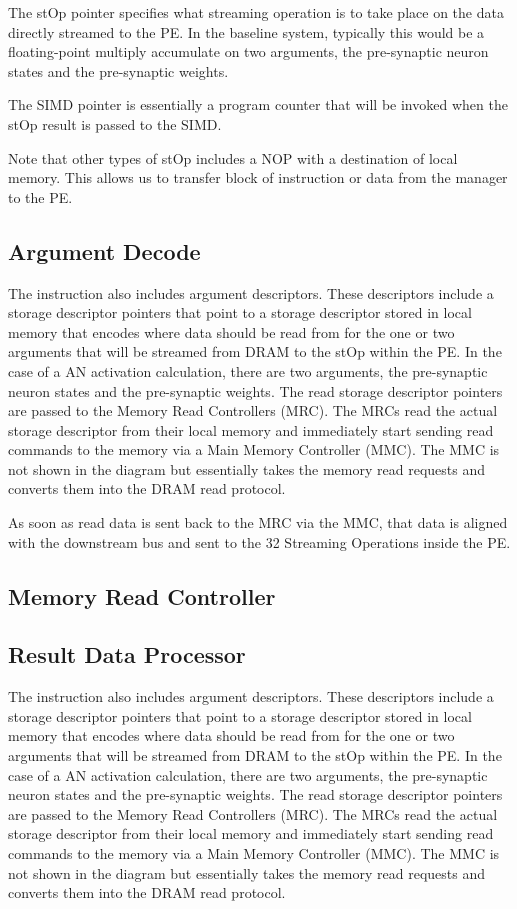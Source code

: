 The stOp pointer specifies what streaming operation is to take place on the data directly streamed to the PE. In the baseline system, typically this would be a floating-point multiply accumulate on two arguments, the pre-synaptic neuron states and the pre-synaptic weights.

The SIMD pointer is essentially a program counter that will be invoked when the stOp result is passed to the SIMD.

Note that other types of stOp includes a NOP with a destination of local memory. This allows us to transfer block of instruction or data from the manager to the PE.


\subsection{Argument Decode}
\label{sec:argumentDecode}
The instruction also includes argument descriptors. These descriptors include a storage descriptor pointers that point to a storage descriptor stored in local memory that encodes where data should be read from for the one or two arguments that will be streamed from DRAM to the stOp within the PE. In the case of a AN activation calculation, there are two arguments, the pre-synaptic neuron states and the pre-synaptic weights. The read storage descriptor pointers are passed to the Memory Read Controllers (MRC). The MRCs read the actual storage descriptor from their local memory and immediately start sending read commands to the memory via a Main Memory Controller (MMC). The MMC is not shown in the diagram but essentially takes the memory read requests and converts them into the DRAM read protocol.

As soon as read data is sent back to the MRC via the MMC, that data is aligned with the downstream bus and sent to the 32 Streaming Operations inside the PE.


\subsection{Memory Read Controller}
\label{sec:Memory Read Controller}

\subsection{Result Data Processor}
\label{sec:Result Data Processor}
The instruction also includes argument descriptors. These descriptors include a storage descriptor pointers that point to a storage descriptor stored in local memory that encodes where data should be read from for the one or two arguments that will be streamed from DRAM to the stOp within the PE. In the case of a AN activation calculation, there are two arguments, the pre-synaptic neuron states and the pre-synaptic weights. The read storage descriptor pointers are passed to the Memory Read Controllers (MRC). The MRCs read the actual storage descriptor from their local memory and immediately start sending read commands to the memory via a Main Memory Controller (MMC). The MMC is not shown in the diagram but essentially takes the memory read requests and converts them into the DRAM read protocol.

